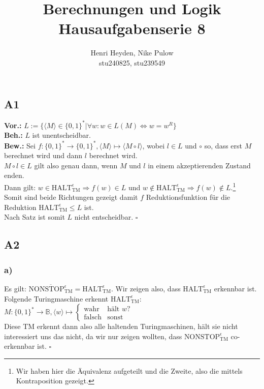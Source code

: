 \documentclass[12pt, a4paper]{article}
\title{Berechnungen und Logik\\Hausaufgabenserie 8}
\author{Henri Heyden, Nike Pulow \\ \small stu240825, stu239549}
\date{}
\newcommand*{\qed}{\null\nobreak\hfill\ensuremath{\square}}
\newcommand*{\gap}{\text{ }}
\newcommand*{\vor}{\textbf{Vor.:} \gap}
\newcommand*{\beh}{\textbf{Beh.:} \gap}
\newcommand*{\bew}{\textbf{Bew.:} \gap}
\newcommand{\HALT}{\text{HALT}_\text{TM}^\epsilon}
\newcommand{\STOPe}{\text{NONSTOP}_\text{TM}^\epsilon}
\begin{document}
\maketitle

\onehalfspacing
\vspace*{-2cm}
\subsection*{A1}
\vor \(L := \{\langle M \rangle \in \{0,1\}^* | \forall w : w \in L(M) \Leftrightarrow w = w^R\}\) \\
\beh \(L\) ist unentscheidbar. \\
\bew Sei \(f : \{0,1\}^* \rightarrow \{0,1\}^*, \langle M \rangle \mapsto \langle M \circ l \rangle\), wobei \(l \in L\) und \(\circ\) so, dass erst \(M\) berechnet wird und dann \(l\) berechnet wird.\\
\(M \circ l \in L\) gilt also genau dann, wenn \(M\) und \(l\) in einem akzeptierenden Zustand enden. \\
Dann gilt: \(w \in \HALT \Rightarrow f(w) \in L\) und \(w \not\in \HALT \Rightarrow f(w) \not\in L\).\footnote[1]{Wir haben hier die Äquivalenz aufgeteilt und die Zweite, also die  mittels Kontraposition gezeigt.} \\
Somit sind beide Richtungen gezeigt damit \(f\) Reduktionsfunktion für die Reduktion \(\HALT \le L\) ist. \\
Nach Satz  ist somit \(L\) nicht entscheidbar. \qed
\subsection*{A2}
\subsubsection*{a)}
Es gilt: \(\overline{\STOPe} = \HALT\). Wir zeigen also, dass \(\HALT\) erkennbar ist. \\
Folgende Turingmaschine erkennt \(\HALT\):\\
\(M : \{0,1\}^* \rightarrow \mathbb B, \langle w \rangle \mapsto \begin{cases}
    \text{wahr} & \text{hält } w \text{?} \\
    \text{falsch} & \text{sonst}
\end{cases}\) \\
Diese TM erkennt dann also alle haltenden Turingmaschinen, hält sie nicht interessiert uns das nicht, da wir nur zeigen wollten, dass \(\STOPe\) co-erkennbar ist. \qed \pagebreak
\end{document}
